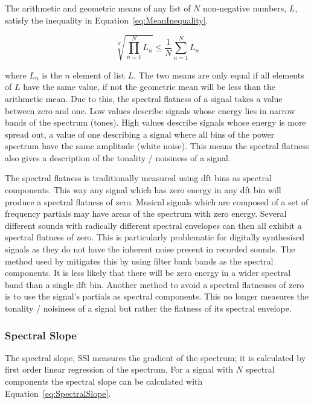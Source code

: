 			The arithmetic and geometric means of any list of $N$ non-negative numbers, $L$, satisfy the
			inequality in Equation~\ref{eq:MeanInequality}.

			\begin{equation}
				\sqrt[N]{\prod_{n = 1}^{N} L_{n}} \leq \frac{1}{N} \sum_{n = 1}^{N} L_{n}
				\label{eq:MeanInequality}
			\end{equation}

			where $L_{n}$ is the $n$ element of list $L$. The two means are only equal if all
			elements of $L$ have the same value, if not the geometric mean will be less than the arithmetic
			mean. Due to this, the spectral flatness of a signal takes a value between zero and one. Low values
			describe signals whose energy lies in narrow bands of the spectrum (tones). High values describe
			signals whose energy is more spread out, a value of one describing a signal where all bins of the
			power spectrum have the same amplitude (white noise). This means the spectral flatness also gives a
			description of the tonality / noisiness of a signal.

			The spectral flatness is traditionally measured using \acrshort{dft} bins as spectral components.
			This way any signal which has zero energy in any \acrshort{dft} bin will produce a spectral
			flatness of zero. Musical signals which are composed of a set of frequency partials may have areas
			of the spectrum with zero energy. Several different sounds with radically different spectral
			envelopes can then all exhibit a spectral flatness of zero. This is particularly problematic for
			digitally synthesised signals as they do not have the inherent noise present in recorded sounds.
			The method used by \citet{peeters2004a} mitigates this by using filter bank bands as the spectral
			components. It is less likely that there will be zero energy in a wider spectral band than a single
			\acrshort{dft} bin. Another method to avoid a spectral flatnesses of zero is to use the signal's
			partials as spectral components.  This no longer measures the tonality / noisiness of a signal but
			rather the flatness of its spectral envelope.

		\subsubsection*{Spectral Slope}
			The spectral slope, $\mathrm{SSl}$ measures the gradient of the spectrum; it is calculated by first
			order linear regression of the spectrum. For a signal with $N$ spectral components the spectral
			slope can be calculated with Equation~\ref{eq:SpectralSlope}.

